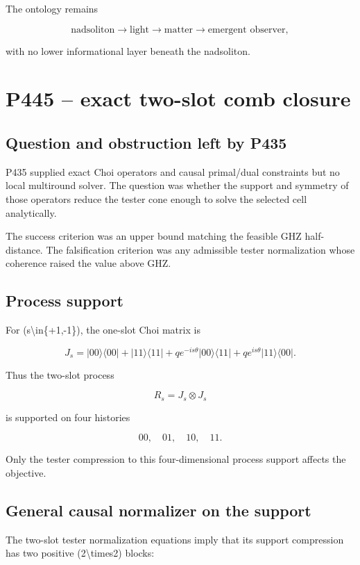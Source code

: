 \documentclass[11pt,a4paper,openany]{report}
\begin{document}
The ontology remains

\[
\text{nadsoliton}\longrightarrow\text{light}\longrightarrow
\text{matter}\longrightarrow\text{emergent observer},
\]

with no lower informational layer beneath the nadsoliton.

\chapter{P445 -- exact two-slot comb closure}

\section{Question and obstruction left by P435}

P435 supplied exact Choi operators and causal primal/\allowbreak{}dual constraints but no local multiround solver. The question was whether the support and symmetry of those operators reduce the tester cone enough to solve the selected cell analytically.

The success criterion was an upper bound matching the feasible GHZ half-distance. The falsification criterion was any admissible tester normalization whose coherence raised the value above GHZ.

\section{Process support}

For (s\textbackslash{}in\{+1,-1\}), the one-slot Choi matrix is

\[
J_s=
|00\rangle\langle00|+|11\rangle\langle11|
+q e^{-is\theta}|00\rangle\langle11|
+q e^{is\theta}|11\rangle\langle00|.
\]

Thus the two-slot process

\[
R_s=J_s\otimes J_s
\]

is supported on four histories

\[
00,\quad01,\quad10,\quad11.
\]

Only the tester compression to this four-dimensional process support affects the objective.

\section{General causal normalizer on the support}

The two-slot tester normalization equations imply that its support compression has two positive (2\textbackslash{}times2) blocks:
\end{document}
